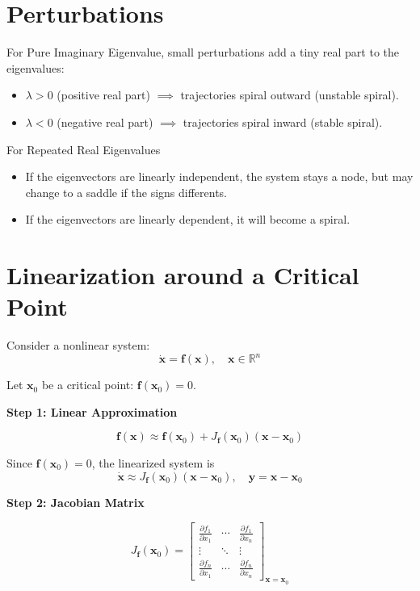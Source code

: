 \documentclass{report}
\begin{document}
\section*{Perturbations}

For Pure Imaginary Eigenvalue,  
small perturbations add a tiny real part to the eigenvalues:

\begin{itemize}
    \item $\lambda > 0$ (positive real part) $\implies$ trajectories spiral outward (unstable spiral).
    \item $\lambda < 0$ (negative real part) $\implies$ trajectories spiral inward (stable spiral).
\end{itemize}

For Repeated Real Eigenvalues

\begin{itemize}
    \item If the eigenvectors are linearly independent, the system stays a node, but may change to a saddle if the signs differents.
    \item If the eigenvectors are linearly dependent, it will become a spiral.
\end{itemize}

\section*{Linearization around a Critical Point}

Consider a nonlinear system:
\[
\dot{\mathbf{x}} = \mathbf{f}(\mathbf{x}), \quad \mathbf{x} \in \mathbb{R}^n
\]

Let $\mathbf{x}_0$ be a critical point: $\mathbf{f}(\mathbf{x}_0) = 0$.

\textbf{Step 1: Linear Approximation}

\[
\mathbf{f}(\mathbf{x}) \approx \mathbf{f}(\mathbf{x}_0) + J_{\mathbf{f}}(\mathbf{x}_0)(\mathbf{x} - \mathbf{x}_0)
\]

Since $\mathbf{f}(\mathbf{x}_0) = 0$, the linearized system is
\[
\dot{\mathbf{x}} \approx J_{\mathbf{f}}(\mathbf{x}_0) (\mathbf{x} - \mathbf{x}_0), \quad
\mathbf{y} = \mathbf{x} - \mathbf{x}_0
\]

\textbf{Step 2: Jacobian Matrix}

\[
J_{\mathbf{f}}(\mathbf{x}_0) =
\begin{bmatrix}
\frac{\partial f_1}{\partial x_1} & \cdots & \frac{\partial f_1}{\partial x_n} \\
\vdots & \ddots & \vdots \\
\frac{\partial f_n}{\partial x_1} & \cdots & \frac{\partial f_n}{\partial x_n} 
\end{bmatrix}_{\mathbf{x} = \mathbf{x}_0}
\]
\end{document}
